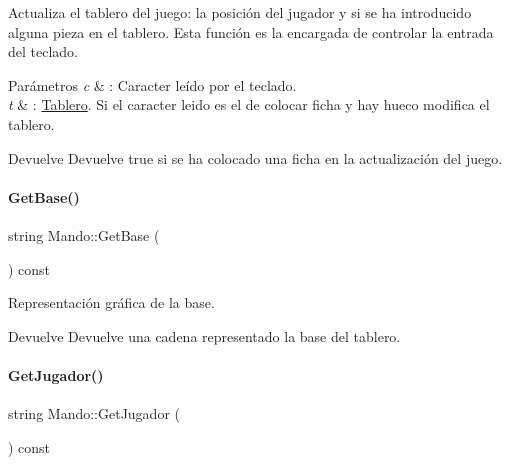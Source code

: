 Actualiza el tablero del juego\+: la posición del jugador y si se ha introducido alguna pieza en el tablero. Esta función es la encargada de controlar la entrada del teclado. 


\begin{DoxyParams}{Parámetros}
{\em c} & \+: Caracter leído por el teclado. \\
\hline
{\em t} & \+: \hyperlink{classTablero}{Tablero}. Si el caracter leido es el de colocar ficha y hay hueco modifica el tablero. \\
\hline
\end{DoxyParams}
\begin{DoxyReturn}{Devuelve}
Devuelve true si se ha colocado una ficha en la actualización del juego. 
\end{DoxyReturn}
\hypertarget{classMando_a656a8d30e54ac1c476e8fab5a7d9e66f}{}\label{classMando_a656a8d30e54ac1c476e8fab5a7d9e66f} 
\paragraph{\texorpdfstring{Get\+Base()}{GetBase()}}
{\footnotesize\ttfamily string Mando\+::\+Get\+Base (\begin{DoxyParamCaption}{ }\end{DoxyParamCaption}) const\hspace{0.3cm}{\ttfamily [inline]}}



Representación gráfica de la base. 

\begin{DoxyReturn}{Devuelve}
Devuelve una cadena representado la base del tablero. 
\end{DoxyReturn}
\hypertarget{classMando_a6ca29d035353a57aba1bd785d8f81c89}{}\label{classMando_a6ca29d035353a57aba1bd785d8f81c89} 
\paragraph{\texorpdfstring{Get\+Jugador()}{GetJugador()}}
{\footnotesize\ttfamily string Mando\+::\+Get\+Jugador (\begin{DoxyParamCaption}{ }\end{DoxyParamCaption}) const\hspace{0.3cm}{\ttfamily [inline]}}



